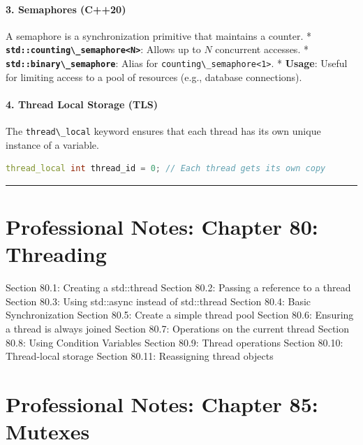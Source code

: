 \hypertarget{semaphores-c20}{%
\subsubsection{3. Semaphores (C++20)}\label{semaphores-c20}}

A semaphore is a synchronization primitive that maintains a counter. *
\textbf{\passthrough{\lstinline!std::counting\_semaphore<N>!}}: Allows
up to \(N\) concurrent accesses. *
\textbf{\passthrough{\lstinline!std::binary\_semaphore!}}: Alias for
\passthrough{\lstinline!counting\_semaphore<1>!}. * \textbf{Usage}:
Useful for limiting access to a pool of resources (e.g., database
connections).

\hypertarget{thread-local-storage-tls}{%
\subsubsection{4. Thread Local Storage
(TLS)}\label{thread-local-storage-tls}}

The \passthrough{\lstinline!thread\_local!} keyword ensures that each
thread has its own unique instance of a variable.

\begin{lstlisting}[language={C++}]
thread_local int thread_id = 0; // Each thread gets its own copy
\end{lstlisting}

\begin{center}\rule{0.5\linewidth}{0.5pt}\end{center}

\hypertarget{professional-notes-chapter-80-threading}{%
\chapter{Professional Notes: Chapter 80:
Threading}\label{professional-notes-chapter-80-threading}}

Section 80.1: Creating a std::thread Section 80.2: Passing a reference
to a thread Section 80.3: Using std::async instead of std::thread
Section 80.4: Basic Synchronization Section 80.5: Create a simple thread
pool Section 80.6: Ensuring a thread is always joined Section 80.7:
Operations on the current thread Section 80.8: Using Condition Variables
Section 80.9: Thread operations Section 80.10: Thread-local storage
Section 80.11: Reassigning thread objects

\hypertarget{professional-notes-chapter-85-mutexes}{%
\chapter{Professional Notes: Chapter 85:
Mutexes}\label{professional-notes-chapter-85-mutexes}}


